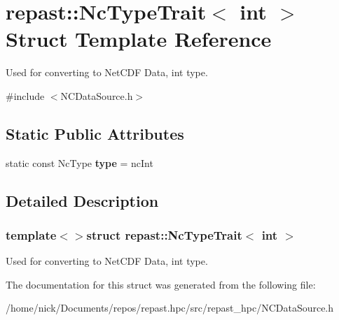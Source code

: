 \hypertarget{structrepast_1_1_nc_type_trait_3_01int_01_4}{\section{repast\-:\-:Nc\-Type\-Trait$<$ int $>$ Struct Template Reference}
\label{structrepast_1_1_nc_type_trait_3_01int_01_4}
}


Used for converting to Net\-C\-D\-F Data, int type.  




{\ttfamily \#include $<$N\-C\-Data\-Source.\-h$>$}

\subsection*{Static Public Attributes}
\begin{DoxyCompactItemize}
\item 
\hypertarget{structrepast_1_1_nc_type_trait_3_01int_01_4_a561856ea039727017e32a5d1313fad5b}{static const Nc\-Type {\bfseries type} = nc\-Int}\label{structrepast_1_1_nc_type_trait_3_01int_01_4_a561856ea039727017e32a5d1313fad5b}

\end{DoxyCompactItemize}


\subsection{Detailed Description}
\subsubsection*{template$<$$>$struct repast\-::\-Nc\-Type\-Trait$<$ int $>$}

Used for converting to Net\-C\-D\-F Data, int type. 

The documentation for this struct was generated from the following file\-:\begin{DoxyCompactItemize}
\item 
/home/nick/\-Documents/repos/repast.\-hpc/src/repast\-\_\-hpc/N\-C\-Data\-Source.\-h\end{DoxyCompactItemize}
